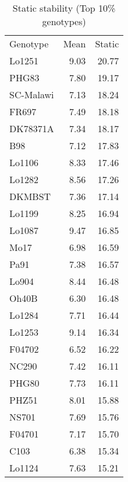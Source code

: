 \documentclass[a4paper,11pt]{article}\usepackage[]{graphicx}\usepackage[]{xcolor}
\begin{document}
\begin{table}[ht]
\begin{flushleft}
\caption{Static stability (Top 10\% genotypes)} 
\label{static}
\begin{tabular}{lrr}
 Genotype & Mean & Static \\ 
 Lo1251 & 9.03 & 20.77 \\ 
  PHG83 & 7.80 & 19.17 \\ 
  SC-Malawi & 7.13 & 18.24 \\ 
  FR697 & 7.49 & 18.18 \\ 
  DK78371A & 7.34 & 18.17 \\ 
  B98 & 7.12 & 17.83 \\ 
  Lo1106 & 8.33 & 17.46 \\ 
  Lo1282 & 8.56 & 17.26 \\ 
  DKMBST & 7.36 & 17.14 \\ 
  Lo1199 & 8.25 & 16.94 \\ 
  Lo1087 & 9.47 & 16.85 \\ 
  Mo17 & 6.98 & 16.59 \\ 
  Pa91 & 7.38 & 16.57 \\ 
  Lo904 & 8.44 & 16.48 \\ 
  Oh40B & 6.30 & 16.48 \\ 
  Lo1284 & 7.71 & 16.44 \\ 
  Lo1253 & 9.14 & 16.34 \\ 
  F04702 & 6.52 & 16.22 \\ 
  NC290 & 7.42 & 16.11 \\ 
  PHG80 & 7.73 & 16.11 \\ 
  PHZ51 & 8.01 & 15.88 \\ 
  NS701 & 7.69 & 15.76 \\ 
  F04701 & 7.17 & 15.70 \\ 
  C103 & 6.38 & 15.34 \\ 
  Lo1124 & 7.63 & 15.21 \\ 
  \end{tabular}
\end{flushleft}
\end{table}
\end{document}
